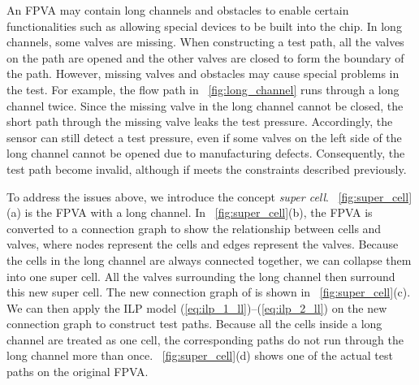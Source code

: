 An FPVA may contain long channels and obstacles to enable certain
functionalities such as allowing special devices to be built into the chip. 
In long channels, some valves are missing. 
When constructing a test path, all the valves on the path are opened
and the other valves are closed to form the boundary of the path. However,
missing valves and obstacles may cause special problems in the test.
For example, the flow path in \figname~\ref{fig:long_channel}  runs through
a long channel twice.  Since the missing valve in the long channel cannot be
closed, the short path through the missing valve leaks the test pressure.
Accordingly, the sensor can still detect a test pressure, even if some
valves 
on the left side of the long channel
cannot be opened due to manufacturing defects.
Consequently, the test path become invalid, although if meets the constraints
described previously.

%

To address the issues above, we introduce the concept \textit{super cell}.
\figname~\ref{fig:super_cell}(a) is the FPVA with a long channel. In
\figname~\ref{fig:super_cell}(b), the FPVA is converted to a connection graph
to show the relationship between cells and valves, where nodes represent the
cells and edges represent the valves. Because the cells in
the long channel are always connected together, we can collapse them into one
super cell. All the valves surrounding the long channel then surround this new
super cell. The new connection graph of is shown in
\figname~\ref{fig:super_cell}(c). We can then apply the ILP model
(\ref{eq:ilp_1_ll})--(\ref{eq:ilp_2_ll}) 
on the new connection graph to construct test paths.  Because all the cells
inside a long channel are treated as one cell, the corresponding paths do not run
through the long channel more than once. \figname~\ref{fig:super_cell}(d)
shows one of the actual test paths on the original FPVA. 

